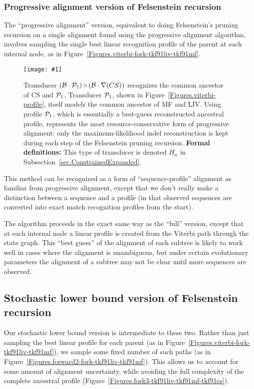 \documentclass{article}
\newcommand{\secref}[1]{Subsection~\ref{sec.#1}}
\newcommand{\figref}[1]{Figure~\ref{Figures.#1}}
\newcommand{\figlabel}[1]{\label{Figures.#1}}
\newcommand{\easyfig}[4]{
\begin{figure}
\texttt{[image: \#1]}
\caption{ \figlabel{#3} #4}
\end{figure}}
\newcommand{\widepdffig}[2]{\easyfig{#1-fig.pdf}{width=\textwidth}{#1}{#2}}
\newcommand\tkf{{\cal B}}
\newcommand\profile{{\cal P}}
\newcommand\formaldefs{{\bf Formal definitions: }}
\newcommand\fork{\circ}
\newcommand\recognize{\nabla}
\begin{document}
\subsubsection{Progressive alignment version of Felsenstein recursion}

The ``progressive alignment'' version,
equivalent to doing Felsenstein's pruning recursion on a single alignment
found using the progressive alignment algorithm,
involves sampling the single best linear recognition profile of the parent
 at each internal node, 
as in \figref{viterbi-fork-tkf91liv-tkf91mf}.  

\widepdffig{fork-tkf91viterbi-tkf91cs}{Transducer $(\tkf \cdot \profile_1)\fork(\tkf \cdot \recognize(CS))$ recognizes the common ancestor of CS and $\profile_1$.
Transducer $\profile_1$, shown in \figref{viterbi-profile}, itself models the common ancestor of MF and LIV.
Using profile $\profile_1$, which is essentially a best-guess reconstructed ancestral profile, represents the most resource-conservative form of progressive alignment: only the 
maximum-likelihood indel reconstruction is kept during each step of the Felsenstein pruning recursion.
\formaldefs
This type of transducer is denoted $H_n$ in \secref{ConstrainedExpanded}.
}

This method can be recognized as a form of ``sequence-profile''
 alignment as familiar from progressive alignment,
except that we don't really make a distinction between a sequence and a profile
(in that observed sequences are converted into exact match recognition
 profiles from the start).

The algorithm proceeds in the exact same way as the ``full'' version, 
except that at each internal node a linear profile is created from the Viterbi
path through the state graph.  This ``best guess'' of the alignment of each subtree
is likely to work well in cases where the alignment is unambiguous, but under
certain evolutionary parameters the alignment of a subtree may not be clear
until more sequences are observed. 

\subsection{Stochastic lower bound version of Felsenstein recursion}

Our stochastic lower bound version is intermediate to these two.
Rather than just sampling the best linear profile for each parent
(as in \figref{viterbi-fork-tkf91liv-tkf91mf}),
we sample some fixed number of such paths
(as in \figref{forward2-fork-tkf91liv-tkf91mf}).
This allows us to account for some amount of alignment uncertainty,
while avoiding the full complexity of the complete ancestral profile
(\figref{fork3-tkf91liv-tkf91mf-tkf91cs}).
\end{document}
